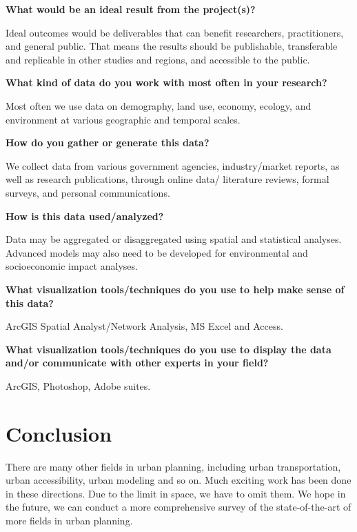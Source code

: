 \documentclass{egpubl}
\begin{document}
\textbf{What would be an ideal result from the project(s)?}

Ideal outcomes would be deliverables that can benefit researchers, practitioners, and general public. That means the results should be publishable, transferable and replicable in other studies and regions, and accessible to the public.

\textbf{What kind of data do you work with most often in your research?}

Most often we use data on demography, land use, economy, ecology, and environment at various geographic and temporal scales.

\textbf{How do you gather or generate this data?}

We collect data from various government agencies, industry/market reports, as well as research publications, through online data/ literature reviews, formal surveys, and personal communications.

\textbf{How is this data used/analyzed?}

Data may be aggregated or disaggregated using spatial and statistical analyses. Advanced models may also need to be developed for environmental and socioeconomic impact analyses.

\textbf{What visualization tools/techniques do you use to help make sense of this data?}

ArcGIS Spatial Analyst/Network Analysis, MS Excel and Access.

\textbf{What visualization tools/techniques do you use to display the data and/or communicate with other experts in your field?}

ArcGIS, Photoshop, Adobe suites.

\section{Conclusion}
There are many other fields in urban planning, including urban transportation, urban accessibility, urban modeling and so on. Much exciting work has been done in these directions. Due to the limit in space, we have to omit them. We hope in the future, we can conduct a more comprehensive survey of the state-of-the-art of more fields in urban planning.


%




\end{document}
